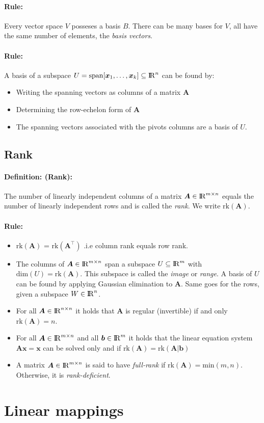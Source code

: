 \documentclass[12pt]{article}
\newcommand{\R}{{\rm I\!R}}
\newcommand{\A}{{\bm{A}}}
\newcommand{\vecs}[2]{{\bm{#1}_1, \dots, \bm{#1}_#2}}
\newcommand{\xdefinition}[2]{\paragraph{\colorbox{#1!30}{\textbf{Definition:}} (#2):}}
\newcommand{\xrule}[1]{\paragraph{\colorbox{#1!30}{\textbf{Rule:}}}}
\begin{document}
\xrule{green} Every vector space $V$ posseses a basis $B$. There can be many bases for $V$, all have the same number of elements, the \textit{basis vectors}.

\xrule{green} A basis of a subspace $U = \text{span}[\vecs{x}{k}] \subseteq \R^n$ can be found by:
%
\begin{itemize}
	\item Writing the spanning vectors as columns of a matrix $\A$
	\item Determining the row-echelon form of $\A$
	\item The spanning vectors associated with the pivots columns are a basis of $U$. 
\end{itemize}

\subsection{Rank}

\xdefinition{green}{Rank} The number of linearly independent columns of a matrix $\A \in \R^{m \times n}$ equals the number of linearly independent rows and is called the \textit{rank}. We write $\text{rk}(\A)$.

\xrule{blue}
%
\begin{itemize}
	\item $\text{rk}(\A)$ = $\text{rk}(\A^\top)$ .i.e column rank equals row rank.
	\item The columns of $\A \in \R^{m \times n}$ span a subspace $U \subseteq \R^m$ with $\text{dim}(U) = \text{rk}(\A)$. This subspace is called the \textit{image} or \textit{range}. A basis of $U$ can be found by applying Gaussian elimination to $\A$. Same goes for the rows, given a subspace $W \in \R^n$.	
	\item For all $\A \in \R^{n \times n}$ it holds that $\A$ is regular (invertible) if and only $\text{rk}(\A) = n$.
	\item For all $\A \in \R^{m \times n}$ and all $\bm{b} \in \R^m$ it holds that the linear equation system $\A \bm{x} = \bm{x}$ can be solved only and if $\text{rk}(\A) = \text{rk}(\A | \bm{b})$
	\item A matrix $\A \in \R^{m \times n}$ is said to have \textit{full-rank} if $\text{rk}(\A) = \text{min}(m, n)$. Otherwise, it is \textit{rank-deficient}.
\end{itemize}

\section{Linear mappings}
\end{document}
